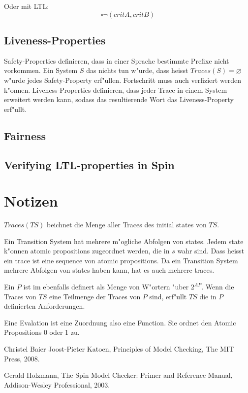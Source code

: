 \documentclass[11pt,twoside,a4paper]{article}
\begin{document}
Oder mit LTL:
\[
\square \neg (critA,critB)
\]

\subsection{Liveness-Properties}
\label{sec:liveness}

Safety-Properties definieren, dass in einer Sprache bestimmte Prefixe nicht vorkommen. Ein System $S$ das nichts tun w"urde, dass heisst $Traces(S)=\varnothing$ w"urde jedes Safety-Property erf"ullen. Fortschritt muss auch verfiziert werden k"onnen. Liveness-Properties definieren, dass jeder Trace in einem System erweitert werden kann, sodass das resultierende Wort das Liveness-Property erf"ullt.


\subsection{Fairness}
\label{sec:fairness}


\subsection{Verifying LTL-properties in Spin}
\label{sec:verifying_ltl-properties}


\appendix

\section{Notizen}

$Traces(TS)$ beichnet die Menge aller Traces des initial states von $TS$.

 Ein Transition System hat mehrere m"ogliche Abfolgen von states. Jedem state k"onnen atomic propositions zugeordnet werden, die in $s$ wahr sind. Dass heisst ein trace ist eine sequence von atomic propositions. Da ein Transition System mehrere Abfolgen von states haben kann, hat es auch mehrere traces.

Ein $P$ ist im ebenfalls definert als Menge von W"ortern "uber $2^{AP}$. Wenn die Traces von $TS$ eine Teilmenge der Traces von $P$ sind, erf"ullt $TS$ die in $P$ definierten Anforderungen.

Eine Evalation ist eine Zuordnung also eine Function. Sie ordnet den Atomic Propositions 0 oder 1 zu. 





\begin{thebibliography}{9}
Christel Baier Joost-Pieter Katoen,
Principles of Model Checking,
The MIT Press,
2008.

Gerald Holzmann,
The Spin Model Checker: Primer and Reference Manual,
Addison-Wesley Professional,
2003.
\end{thebibliography}
\end{document}
